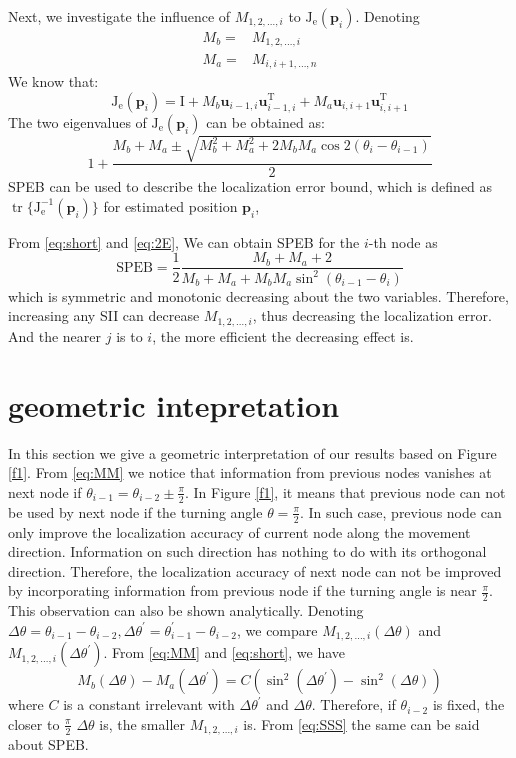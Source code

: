 \documentclass[conference]{IEEEtran}
\DeclareMathOperator\tr{tr}
\begin{document}
Next, we investigate the influence of $M_{1,2,\dots,i}$ to $\bm{\mathrm{J}}_{\mathrm{e}}(\bm{p}_i)$.
Denoting 
\begin{align}\label{eq:short}
M_{b}=&M_{1,2,\dots,i}\nonumber\\
M_{a}=&M_{i,i+1,\dots,n}
\end{align}
We know that:
\[
\bm{\mathrm{J}}_{\mathrm{e}}(\bm{p}_i)=\bm{\mathrm{I}}+M_{b}\bm{u}_{i-1,i}\bm{u}_{i-1,i}^{\mathrm{T}}+M_{a}\bm{u}_{i,i+1}\bm{u}_{i,i+1}^{\mathrm{T}}
\]
The two eigenvalues of $\bm{\mathrm{J}}_{\mathrm{e}}(\bm{p}_i)$ can be obtained as:
\begin{equation}\label{eq:2E}
1+\frac{M_{b}+M_{a}\pm \sqrt{M_{b}^2+M_{a}^2+2M_{b}M_{a}\cos2(\theta_i-\theta_{i-1})}}{2}
\end{equation}
SPEB can be used to describe the localization error bound, which is defined as $\tr\{\bm{\mathrm{J}}_{\mathrm{e}}^{-1}(\bm{p}_i)\} $ for estimated position $\bm{p}_i$,

From \eqref{eq:short} and \eqref{eq:2E},
We can obtain SPEB for the $i$-th node as
\begin{equation}\label{eq:SSS}
\text{SPEB}=\frac{1}{2}\frac{M_{b}+M_{a}+2}{M_{b}+M_{a}+M_{b}M_{a}\sin^2(\theta_{i-1}-\theta_{i})}
\end{equation}
which is symmetric and monotonic decreasing about the two variables.
Therefore, increasing any SII can decrease $M_{1,2,\dots,i}$, thus decreasing the localization error. And the nearer $j$ is to $i$, the more efficient the decreasing effect is. 
\section{geometric intepretation}\label{geometry}
In this section we give a geometric interpretation of our results based on Figure \ref{f1}.
From \eqref{eq:MM} we notice that information from previous nodes vanishes at next node 
if $\theta_{i-1}=\theta_{i-2}\pm\frac{\pi}{2}$.
In Figure \ref{f1}, it means that previous node can not be used by next node if the turning angle $\theta=\frac{\pi}{2}$.
In such case, previous node can only improve the localization accuracy of current node along the movement direction. 
Information on such direction has nothing to do with its orthogonal direction. 
Therefore, the localization accuracy of next node can not be improved by incorporating information 
from previous node if the turning angle is near $\frac{\pi}{2}$. 
This observation can also be shown analytically. Denoting $\Delta \theta=\theta_{i-1}-\theta_{i-2},\Delta \theta^{\prime}=\theta_{i-1}^{\prime}-\theta_{i-2}$, 
we compare $M_{1,2,\dots,i}(\Delta \theta)$ and $M_{1,2,\dots,i}(\Delta \theta^{\prime})$. 
From \eqref{eq:MM} and \eqref{eq:short}, we have
\begin{equation}
M_{b}(\Delta \theta)-M_{a}(\Delta \theta^{\prime})=C (\sin^2(\Delta \theta^{\prime})-\sin^2(\Delta \theta))\end{equation}
where $C$ is a constant irrelevant with $\Delta \theta^{\prime}$ and $\Delta \theta$.
Therefore, if $\theta_{i-2}$ is fixed, the closer to $\frac{\pi}{2}$ $\Delta \theta$ is, the smaller $M_{1,2,\dots,i}$ is.
From \eqref{eq:SSS} the same can be said about SPEB.
\end{document}
